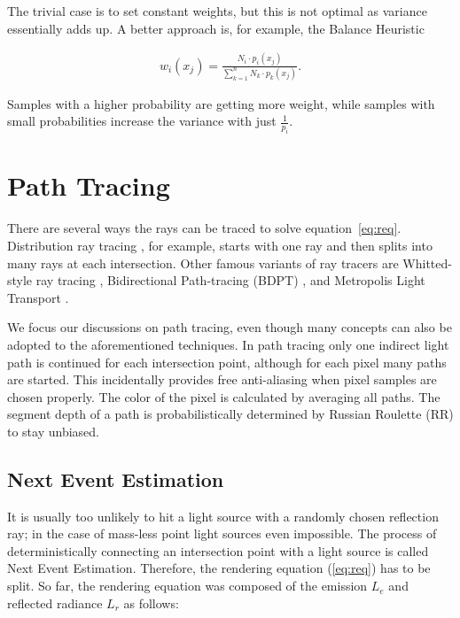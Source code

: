 The trivial case is to set constant weights, but this is not optimal as variance essentially adds up. A better approach is, for example, the Balance Heuristic

\begin{align}
w_i(x_j) = \frac{N_i \cdot p_i(x_j)}{\sum_{k=1}^{n} N_k \cdot p_k(x_j)}.
\end{align}

Samples with a higher probability are getting more weight, while samples with small probabilities increase the variance with just $\frac{1}{p_i}$.

\section{Path Tracing}

There are several ways the rays can be traced to solve equation~\ref{eq:req}. Distribution ray tracing \parencite{DBLP:conf/siggraph/CookPC84}, for example, starts with one ray and then splits into many rays at each intersection. Other famous variants of ray tracers are Whitted-style ray tracing \parencite{DBLP:journals/cacm/Whitted80}, Bidirectional Path-tracing (BDPT) \parencite{DBLP:conf/rt/LafortuneW96}, and Metropolis Light Transport \parencite{DBLP:conf/siggraph/VeachG97}.

We focus our discussions on path tracing, even though many concepts can also be adopted to the aforementioned techniques. In path tracing only one indirect light path is continued for each intersection point, although for each pixel many paths are started. This incidentally provides free anti-aliasing when pixel samples are chosen properly. The color of the pixel is calculated by averaging all paths. The segment depth of a path is probabilistically determined by Russian Roulette (RR) to stay unbiased.

\subsection{Next Event Estimation}
\label{sec:NEE}

It is usually too unlikely to hit a light source with a randomly chosen reflection ray; in the case of mass-less point light sources even impossible. The process of deterministically connecting an intersection point with a light source is called Next Event Estimation. Therefore, the rendering equation (\ref{eq:req}) has to be split. So far, the rendering equation was composed of the emission $L_e$ and reflected radiance $L_r$ as follows:


